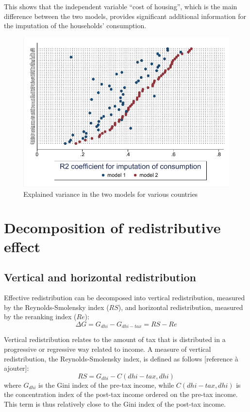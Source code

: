 This shows that the independent variable ``cost of housing'', which is the main difference between the two models, provides significant additional information for the imputation of the households' consumption.

\begin{figure}[!h]
\centering
\includegraphics[width=\textwidth]{images/19-04-05_R2_compare_models}
\caption{Explained variance in the two models for various countries}
\label{fig:compare_models}  
\end{figure}

\section{Decomposition of redistributive effect}

\subsection{Vertical and horizontal redistribution}
\label{sec:decomposition}
Effective redistribution can be decomposed into vertical redistribution, measured by the Reynolds-Smolensky index ($RS$), and horizontal redistribution, measured by the reranking index ($Re$):
\begin{equation}
 \label{equ:g_diff}
    \Delta G = G_{dhi} - G_{dhi-tax}  = RS - Re
\end{equation}

Vertical redistribution relates to the amount of tax that is distributed in a progressive or regressive way related to income. A measure of vertical redistribution, the Reynolds-Smolensky index, is defined as follows [reference à ajouter]:
\[ RS = G_{dhi} - C(dhi-tax, dhi) \]
where $G_{dhi}$ is the Gini index of the pre-tax income, while $C(dhi-tax,dhi)$ is the concentration index of the post-tax income ordered on the pre-tax income. This term is thus relatively close to the Gini index of the post-tax income.

